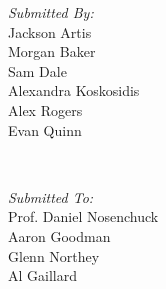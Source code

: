 \begin{titlepage}
\begin{minipage}[t]{0.4\textwidth}
\begin{flushleft} \large
\emph{Submitted By:}\\
Jackson Artis\\
Morgan Baker\\
Sam Dale\\
Alexandra Koskosidis\\
Alex Rogers\\
Evan Quinn
\end{flushleft}
\end{minipage}
~
\begin{minipage}[t]{0.4\textwidth}
\begin{flushright} \large
\emph{Submitted To:} \\
Prof. Daniel Nosenchuck\\
Aaron Goodman\\
Glenn Northey\\
Al Gaillard
\end{flushright}
\end{minipage}\\[1cm]

\vfill %

\end{titlepage}


%